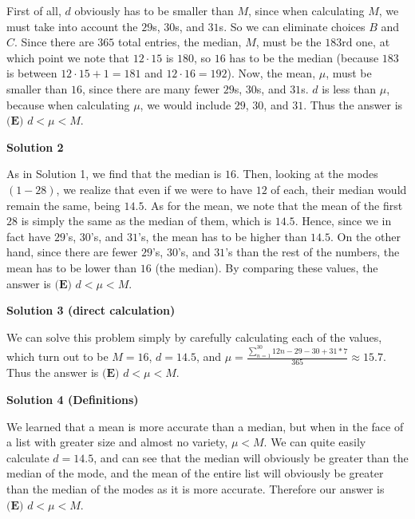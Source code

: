 \begin{enumerate}
First of all, $d$ obviously has to be smaller than $M$, since when calculating $M$, we must take into account the $29$s, $30$s, and $31$s. So we can eliminate choices $B$ and $C$. Since there are $365$ total entries, the median, $M$, must be the $183\text{rd}$ one, at which point we note that $12 \cdot 15$ is $180$, so $16$ has to be the median (because $183$ is between $12 \cdot 15 + 1 = 181$ and $12 \cdot 16 = 192$). Now, the mean, $\mu$, must be smaller than $16$, since there are many fewer $29$s, $30$s, and $31$s. $d$ is less than $\mu$, because when calculating $\mu$, we would include $29$, $30$, and $31$. Thus the answer is $\boxed{\textbf{(E) } d < \mu < M}$.

 



\textbf{Solution 2}

As in Solution 1, we find that the median is $16$. Then, looking at the modes $(1-28)$, we realize that even if we were to have $12$ of each, their median would remain the same, being $14.5$. As for the mean, we note that the mean of the first $28$ is simply the same as the median of them, which is $14.5$. Hence, since we in fact have $29$'s, $30$'s, and $31$'s, the mean has to be higher than $14.5$. On the other hand, since there are fewer $29$'s, $30$'s, and $31$'s than the rest of the numbers, the mean has to be lower than $16$ (the median). By comparing these values, the answer is $\boxed{\textbf{(E) } d < \mu < M}$.

 



\textbf{Solution 3 (direct calculation)}

We can solve this problem simply by carefully calculating each of the values, which turn out to be $M=16$, $d=14.5$, and $\mu = \frac{\sum_{n=1}^{30} 12n - 29 - 30 +31*7}{365} \approx 15.7$. Thus the answer is $\boxed{\textbf{(E) } d < \mu < M}$.

 



\textbf{Solution 4 (Definitions)}

We learned that a mean is more accurate than a median, but when in the face of a list with greater size and almost no variety, \( \mu < M \). We can quite easily calculate \( d = 14.5 \), and can see that the median will obviously be greater than the median of the mode, and the mean of the entire list will obviously be greater than the median of the modes as it is more accurate. Therefore our answer is $\boxed{\textbf{(E) } d < \mu < M}$.


\end{enumerate}
